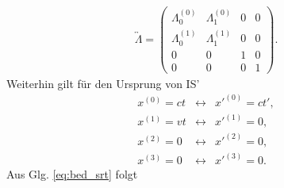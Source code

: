 \documentclass{book}
\begin{document}
%
\begin{eqnarray}
\overleftrightarrow{\Lambda} = \left(\begin{array}{cccc}
\Lambda_0^{(0)}&\Lambda_1^{(0)}&0&0\\
\Lambda_0^{\left(1\right)}&\Lambda_1^{\left(1\right)}&0&0\\
0&0&1&0\\
0&0&0&1
\end{array}\right).
\end{eqnarray}
%
Weiterhin gilt für den Ursprung von IS'
%
\begin{eqnarray}
x^{\left(0\right)} = ct&\leftrightarrow&x'^{\left(0\right)} = ct',\\
x^{\left(1\right)} = vt&\leftrightarrow&x'^{\left(1\right)} = 0,\\
x^{\left(2\right)} = 0&\leftrightarrow&x'^{\left(2\right)} = 0,\\
x^{\left(3\right)} = 0&\leftrightarrow&x'^{\left(3\right)} = 0.
\end{eqnarray}
%
Aus Glg. \eqref{eq:bed_srt} folgt
%
\end{document}

